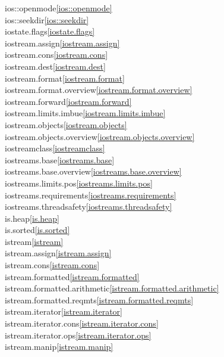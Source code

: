 \begin{multicols}{2}
ios::openmode\quad\ref{ios::openmode}\\
ios::seekdir\quad\ref{ios::seekdir}\\
iostate.flags\quad\ref{iostate.flags}\\
iostream.assign\quad\ref{iostream.assign}\\
iostream.cons\quad\ref{iostream.cons}\\
iostream.dest\quad\ref{iostream.dest}\\
iostream.format\quad\ref{iostream.format}\\
iostream.format.overview\quad\ref{iostream.format.overview}\\
iostream.forward\quad\ref{iostream.forward}\\
iostream.limits.imbue\quad\ref{iostream.limits.imbue}\\
iostream.objects\quad\ref{iostream.objects}\\
iostream.objects.overview\quad\ref{iostream.objects.overview}\\
iostreamclass\quad\ref{iostreamclass}\\
iostreams.base\quad\ref{iostreams.base}\\
iostreams.base.overview\quad\ref{iostreams.base.overview}\\
iostreams.limits.pos\quad\ref{iostreams.limits.pos}\\
iostreams.requirements\quad\ref{iostreams.requirements}\\
iostreams.threadsafety\quad\ref{iostreams.threadsafety}\\
is.heap\quad\ref{is.heap}\\
is.sorted\quad\ref{is.sorted}\\
istream\quad\ref{istream}\\
istream.assign\quad\ref{istream.assign}\\
istream.cons\quad\ref{istream.cons}\\
istream.formatted\quad\ref{istream.formatted}\\
istream.formatted.arithmetic\quad\ref{istream.formatted.arithmetic}\\
istream.formatted.reqmts\quad\ref{istream.formatted.reqmts}\\
istream.iterator\quad\ref{istream.iterator}\\
istream.iterator.cons\quad\ref{istream.iterator.cons}\\
istream.iterator.ops\quad\ref{istream.iterator.ops}\\
istream.manip\quad\ref{istream.manip}\\

\end{multicols}
